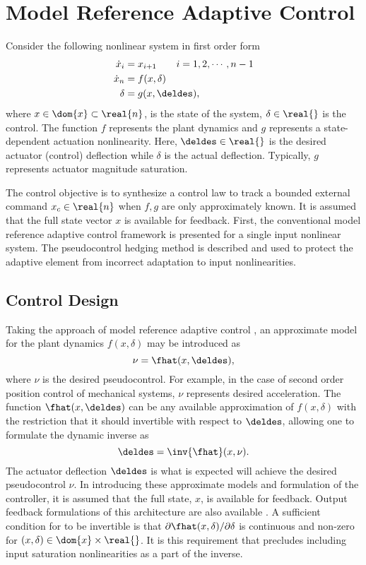 \section{Model Reference Adaptive Control}
\label{c:background} Consider the following nonlinear system in first
order form
\begin{equation}
\label{e:simple:fxu}
\begin{split}
\dot{x}_i &= x_{i+1} \qquad i = 1,2,\cdots,n-1 \\
\dot{x}_n &= f(x,\delta)\\
\delta &= g(x,\deldes),
\end{split}
\end{equation}
where $x \in \dom{x} \subset \real{n}$, is the state of the system,
$\delta \in \real{}$ is the control. The function $f$ represents the
plant dynamics and $g$ represents a state-dependent actuation
nonlinearity. Here, $\deldes \in \real{}$ is the desired actuator
(control) deflection while $\delta$ is the actual deflection.
Typically, $g$ represents actuator magnitude saturation.

The control objective is to synthesize a control law to track a
bounded external command $x_c \in \real{n}$ when $f, g$ are only
approximately known. It is assumed that the full state vector $x$ is
available for feedback. First, the conventional model reference
adaptive control framework is presented for a single input nonlinear
system. The pseudocontrol hedging method is described and used to
protect the adaptive element from incorrect adaptation to input
nonlinearities.

\subsection{Control Design}
Taking the approach of model reference adaptive control
\cite{calise:jgcd:2000}, an approximate model for the plant
dynamics $f(x,\delta)$ may be introduced as
\begin{equation}
\label{e:simple:approx} \nu = \fhat(x,\deldes),
\end{equation}
where $\nu$ is the desired pseudocontrol. For example, in the case
of second order position control of mechanical systems, $\nu$
represents desired acceleration. The function $\fhat(x,\deldes)$ can
be any available approximation of $f(x,\delta)$ with the restriction
that it should invertible with respect to $\deldes$, allowing one to
formulate the dynamic inverse as
\begin{equation}\label{e:simple:inverse}
\deldes = \inv{\fhat}(x,\nu).
\end{equation}
The actuator deflection $\deldes$ is what is expected will achieve
the desired pseudocontrol $\nu$. In introducing these approximate
models and formulation of the controller, it is assumed that the
full state, $x$, is available for feedback. Output feedback
formulations of this architecture are also available
\cite{calise:automatica:2001}. A sufficient condition for
 to be invertible is that
$\partial\fhat(x,\delta)/\partial\delta$ is continuous and non-zero
for $(x,\delta) \in \dom{x}\times\real{}$. It is this requirement
that precludes including input saturation nonlinearities as a part
of the inverse.

